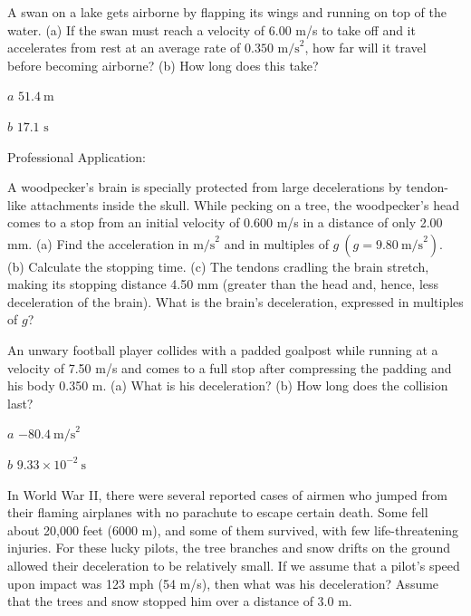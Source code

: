 \documentclass[
]{book}
\begin{document}
\hypertarget{fs-id1164906453058}{}
\leavevmode{}%
A swan on a lake gets airborne by flapping its wings and running on top
of the water. (a) If the swan must reach a velocity of 6.00 m/s to take
off and it accelerates from rest at an average rate of
\({0\text{.}\text{350\ m/s}^{2}}{}\), how far will it travel before
becoming airborne? (b) How long does this take?

\leavevmode{}%
\(a\) \({51\text{.}4\ \text{m}}{}\)

\(b\) \({\text{17}\text{.}\text{1\ s}}{}\)

\hypertarget{fs-id1164906459326}{}
\hypertarget{fs-id1164906459329}{}
{Professional Application:}

A woodpecker's brain is specially protected from large decelerations by
tendon-like attachments inside the skull. While pecking on a tree, the
woodpecker's head comes to a stop from an initial velocity of 0.600 m/s
in a distance of only 2.00 mm. (a) Find the acceleration in
\(\text{m/s}^{2}{}\)\textsuperscript{} and in multiples of
\({g\ \left( {{g = 9}\text{.}\text{80}\ \text{m/s}^{2}} \right)}{}\). (b)
Calculate the stopping time. (c) The tendons cradling the brain stretch,
making its stopping distance 4.50 mm (greater than the head and, hence,
less deceleration of the brain). What is the brain's deceleration,
expressed in multiples of \(g\)?

\hypertarget{fs-id1164906466373}{}
\leavevmode{}%
An unwary football player collides with a padded goalpost while running
at a velocity of 7.50 m/s and comes to a full stop after compressing the
padding and his body 0.350 m. (a) What is his deceleration? (b) How long
does the collision last?

\leavevmode{}%
\(a\) \({{- \text{80}}\text{.}4\ \text{m/s}^{2}}{}\)

\(b\) \({9\text{.}{\text{33} \times \text{10}^{- 2}\ }\text{s}}{}\)

\hypertarget{fs-id1164906495926}{}
\leavevmode{}%
In World War II, there were several reported cases of airmen who jumped
from their flaming airplanes with no parachute to escape certain death.
Some fell about 20,000 feet (6000 m), and some of them survived, with
few life-threatening injuries. For these lucky pilots, the tree branches
and snow drifts on the ground allowed their deceleration to be
relatively small. If we assume that a pilot's speed upon impact was 123
mph (54 m/s), then what was his deceleration? Assume that the trees and
snow stopped him over a distance of 3.0 m.
\end{document}
